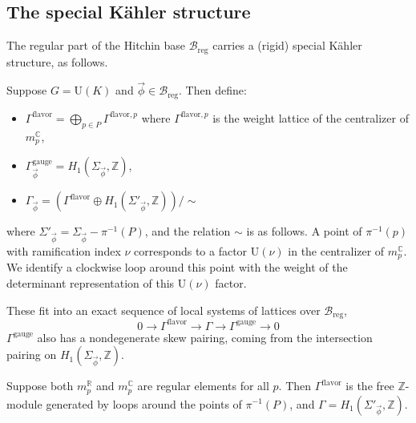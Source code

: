 \documentclass[12pt,letterpaper,reqno]{article}
\numberwithin{equation}{section}
\newcommand{\cB}{\ensuremath{\mathcal B}}
\newcommand{\R}{\ensuremath{\mathbb R}}
\newcommand{\C}{\ensuremath{\mathbb C}}
\newcommand{\Z}{\ensuremath{\mathbb Z}}
\newcommand{\kahler}{K\"ahler\xspace}
\newcommand{\reg}{\mathrm{reg}}
\newcommand{\gauge}{\mathrm{gauge}}
\newcommand{\flavor}{\mathrm{flavor}}
\newcommand{\vphi}{{\vec\phi}}
\newcommand{\U}{\mathrm{U}}
\begin{document}
\subsection{The special \kahler structure}

The regular part of the Hitchin base $\cB_\reg$ 
carries a (rigid) special \kahler structure, as follows.

\begin{defn}[Charge lattices for $G = \U(K)$]
Suppose $G = \U(K)$ and $\vphi \in \cB_\reg$. 
Then define:
\begin{itemize}
 \item $\Gamma^\flavor = \bigoplus_{p \in P} \Gamma^{\flavor,p}$ where $\Gamma^{\flavor,p}$
 is the weight lattice of the centralizer of $m^\C_p$,
 \item $\Gamma_\vphi^\gauge = H_1(\Sigma_\vphi, \Z)$,
 \item $\Gamma_\vphi = \left( \Gamma^\flavor \oplus H_1(\Sigma'_\vphi,\Z) \right) / \sim$
\end{itemize}
where $\Sigma'_\vphi = \Sigma_\vphi - \pi^{-1}(P)$,
and the relation $\sim$ is as follows. A point of $\pi^{-1}(p)$ with ramification index $\nu$ corresponds to a factor $\U(\nu)$ in the centralizer of $m_p^\C$. We identify a clockwise 
loop around this point with the weight of the 
determinant representation of this $\U(\nu)$ factor.
\end{defn}
These fit into an exact sequence of local systems of lattices over $\cB_\reg$,
\begin{equation} \label{eq:lattice-extension}
0 \to \Gamma^\flavor \to \Gamma \to \Gamma^\gauge \to 0
\end{equation}
$\Gamma^\gauge$ also has a nondegenerate skew pairing,
coming from the intersection pairing on $H_1(\Sigma_\vphi, \Z)$.

\begin{example}
Suppose both $m_p^\R$ and $m_p^\C$ are regular elements for 
all $p$.
Then $\Gamma^\flavor$ is the free $\Z$-module generated
by loops around the points of $\pi^{-1}(P)$,
and $\Gamma = H_1(\Sigma'_\vphi, \Z)$.
\end{example}
\end{document}
